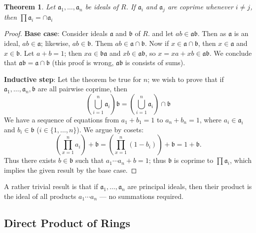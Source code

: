 \documentclass[11pt]{article}
\newtheorem{theorem}{Theorem}
\begin{document}
\begin{adjustwidth}{0.5cm}{}
	\begin{theorem}
		Let $\mathfrak{a}_{1}, \ldots, \mathfrak{a}_{n}$ be ideals of $R$. If $\mathfrak{a}_{i}$ and $\mathfrak{a}_{j}$ are coprime whenever $i \ne j$, then $\prod \mathfrak{a}_{i} = \cap \mathfrak{a}_{i}$
	\end{theorem}
	\begin{proof}
		\textbf{Base case}: Consider ideals $\mathfrak{a}$ and $\mathfrak{b}$ of $R$. and let $ab \in \mathfrak{a}\mathfrak{b}$. Then as $\mathfrak{a}$ is an ideal, $ab \in \mathfrak{a}$; likewise, $ab \in \mathfrak{b}$. Them $ab \in \mathfrak{a} \cap \mathfrak{b}$. Now if $x \in \mathfrak{a} \cap \mathfrak{b}$, then $x \in \mathfrak{a}$ and $x \in \mathfrak{b}$. Let $a + b = 1$; then $xa \in \mathfrak{b}\mathfrak{a}$ and $xb \in \mathfrak{a}\mathfrak{b}$, so $x = xa + xb \in \mathfrak{a}\mathfrak{b}$. We conclude that $\mathfrak{a}\mathfrak{b} = \mathfrak{a} \cap \mathfrak{b}$ (this proof is wrong, $\mathfrak{ab}$ is consists of sums).

		\textbf{Inductive step}: Let the theorem be true for $n$; we wish to prove that if $\mathfrak{a}_{1}, \ldots, \mathfrak{a}_{n}, \mathfrak{b}$ are all pairwise coprime, then
		\[
			\left( \bigcup\limits_{i = 1}^{n} \mathfrak{a}_{i} \right) \mathfrak{b} = \left( \bigcup\limits_{i = 1}^{n} \mathfrak{a}_{i} \right) \cap \mathfrak{b}
		\]
		We have a sequence of equations from $a_{1} + b_{1} = 1$ to $a_{n} + b_{n} = 1$, where $a_{i} \in \mathfrak{a}_{i}$ and $b_{i} \in \mathfrak{b}$ ($i \in \{ 1, \ldots, n \}$). We argue by cosets:
		\[
			\left( \prod\limits_{x = 1}^{n} a_{i} \right) + \mathfrak{b} = \left( \prod\limits_{x = 1}^{n} (1 - b_{i}) \right) + \mathfrak{b} = 1 +  \mathfrak{b}.
		\]
		Thus there exists $b \in \mathfrak{b}$ such that $a_{1} \cdots a_{n} + b = 1$; thus $\mathfrak{b}$ is coprime to $\prod \mathfrak{a}_{i}$, which implies the given result by the base case.
	\end{proof}
\end{adjustwidth}

A rather trivial result is that if $\mathfrak{a}_{1}, \ldots, \mathfrak{a}_{n}$ are principal ideals, then their product is the ideal of all products $a_{1} \cdots a_{n}$ --- no summations required.


\subsection{Direct Product of Rings}
\end{document}

